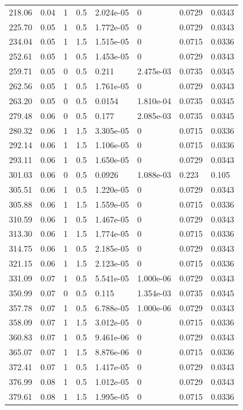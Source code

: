 \documentclass[preview]{standalone}
\begin{document}
{{\begin{tabular}{L{1.2cm}C{1.2cm} C{0.3cm}C{0.5cm} C{1.4cm}C{1.4cm} C{1.4cm}C{1.4cm}}
  218.06  &  0.04  & 1     & 0.5 &  2.024e-05  & 0  & 0.0729 &  0.0343   \\ 
  225.70  &  0.05  & 1     & 0.5 &  1.772e-05  & 0  & 0.0729 &  0.0343   \\ 
  234.04  &  0.05  & 1     & 1.5 &  1.515e-05  & 0  & 0.0715 &  0.0336   \\ 
  252.61  &  0.05  & 1     & 0.5 &  1.453e-05  & 0  & 0.0729 &  0.0343   \\ 
  259.71  &  0.05  & 0     & 0.5 &  0.211  & 2.475e-03  & 0.0735 &  0.0345   \\ 
  262.56  &  0.05  & 1     & 0.5 &  1.761e-05  & 0  & 0.0729 &  0.0343   \\ 
  263.20  &  0.05  & 0     & 0.5 &  0.0154  & 1.810e-04  & 0.0735 &  0.0345   \\ 
  279.48  &  0.06  & 0     & 0.5 &  0.177  & 2.085e-03  & 0.0735 &  0.0345   \\ 
  280.32  &  0.06  & 1     & 1.5 &  3.305e-05  & 0  & 0.0715 &  0.0336   \\ 
  292.14  &  0.06  & 1     & 1.5 &  1.106e-05  & 0  & 0.0715 &  0.0336   \\ 
  293.11  &  0.06  & 1     & 0.5 &  1.650e-05  & 0  & 0.0729 &  0.0343   \\ 
  301.03  &  0.06  & 0     & 0.5 &  0.0926  & 1.088e-03  & 0.223 &  0.105   \\ 
  305.51  &  0.06  & 1     & 0.5 &  1.220e-05  & 0  & 0.0729 &  0.0343   \\ 
  305.88  &  0.06  & 1     & 1.5 &  1.559e-05  & 0  & 0.0715 &  0.0336   \\ 
  310.59  &  0.06  & 1     & 0.5 &  1.467e-05  & 0  & 0.0729 &  0.0343   \\ 
  313.30  &  0.06  & 1     & 1.5 &  1.774e-05  & 0  & 0.0715 &  0.0336   \\ 
  314.75  &  0.06  & 1     & 0.5 &  2.185e-05  & 0  & 0.0729 &  0.0343   \\ 
  321.15  &  0.06  & 1     & 1.5 &  2.123e-05  & 0  & 0.0715 &  0.0336   \\ 
  331.09  &  0.07  & 1     & 0.5 &  5.541e-05  & 1.000e-06  & 0.0729 &  0.0343   \\ 
  350.99  &  0.07  & 0     & 0.5 &  0.115  & 1.354e-03  & 0.0735 &  0.0345   \\ 
  357.78  &  0.07  & 1     & 0.5 &  6.788e-05  & 1.000e-06  & 0.0729 &  0.0343   \\ 
  358.09  &  0.07  & 1     & 1.5 &  3.012e-05  & 0  & 0.0715 &  0.0336   \\ 
  360.83  &  0.07  & 1     & 0.5 &  9.461e-06  & 0  & 0.0729 &  0.0343   \\ 
  365.07  &  0.07  & 1     & 1.5 &  8.876e-06  & 0  & 0.0715 &  0.0336   \\ 
  372.41  &  0.07  & 1     & 0.5 &  1.417e-05  & 0  & 0.0729 &  0.0343   \\ 
  376.99  &  0.08  & 1     & 0.5 &  1.012e-05  & 0  & 0.0729 &  0.0343   \\ 
  379.61  &  0.08  & 1     & 1.5 &  1.995e-05  & 0  & 0.0715 &  0.0336   \\ 
\hline 
\end{tabular} 

}}
\end{document}
